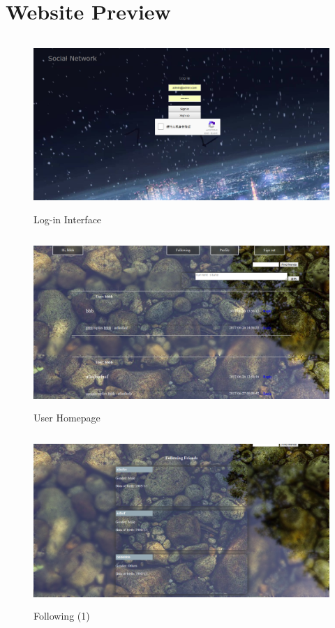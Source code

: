 \section{Website Preview}
\begin{figure}[!htbp]
	\begin{center}
		\includegraphics[width=12cm,height=6.5cm]{p1.png}
		\caption{Log-in Interface}
	\end{center}
\end{figure}
\begin{figure}[!htbp]
	\begin{center}
		\includegraphics[width=12cm,height=6.5cm]{p2.png}
		\caption{User Homepage}
	\end{center}
\end{figure}
\begin{figure}[!htbp]
	\begin{center}
		\includegraphics[width=12cm,height=6.5cm]{p3.png}
		\caption{Following (1)}
	\end{center}
\end{figure}
